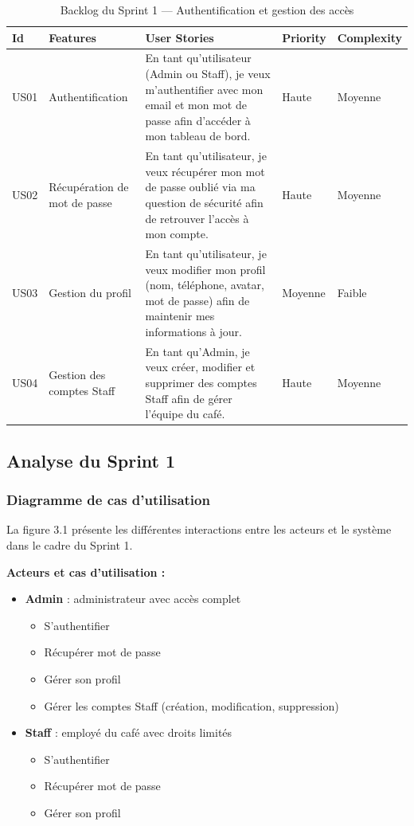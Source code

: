 \begin{table}[h]
\centering
\caption{Backlog du Sprint 1 — Authentification et gestion des accès}
\begin{tabular}{|p{1cm}|p{2.5cm}|p{6cm}|p{1.5cm}|p{1.5cm}|}
\hline
\textbf{Id} & \textbf{Features} & \textbf{User Stories} & \textbf{Priority} & \textbf{Complexity} \\
\hline
US01 & Authentification & En tant qu'utilisateur (Admin ou Staff), je veux m'authentifier avec mon email et mon mot de passe afin d'accéder à mon tableau de bord. & Haute & Moyenne \\
\hline
US02 & Récupération de mot de passe & En tant qu'utilisateur, je veux récupérer mon mot de passe oublié via ma question de sécurité afin de retrouver l'accès à mon compte. & Haute & Moyenne \\
\hline
US03 & Gestion du profil & En tant qu'utilisateur, je veux modifier mon profil (nom, téléphone, avatar, mot de passe) afin de maintenir mes informations à jour. & Moyenne & Faible \\
\hline
US04 & Gestion des comptes Staff & En tant qu'Admin, je veux créer, modifier et supprimer des comptes Staff afin de gérer l'équipe du café. & Haute & Moyenne \\
\hline
\end{tabular}
\end{table}

\subsection{Analyse du Sprint 1}

\subsubsection{Diagramme de cas d'utilisation}

La figure 3.1 présente les différentes interactions entre les acteurs et le système dans le cadre du Sprint 1.

\textbf{Acteurs et cas d'utilisation :}
\begin{itemize}
\item \textbf{Admin} : administrateur avec accès complet
  \begin{itemize}
    \item S'authentifier
    \item Récupérer mot de passe
    \item Gérer son profil
    \item Gérer les comptes Staff (création, modification, suppression)
  \end{itemize}
\item \textbf{Staff} : employé du café avec droits limités
  \begin{itemize}
    \item S'authentifier
    \item Récupérer mot de passe
    \item Gérer son profil
  \end{itemize}
\end{itemize}


